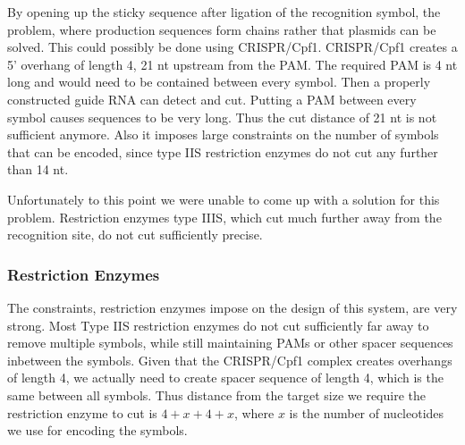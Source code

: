 \documentclass[
11pt, %
a4paper, %
oneside, %
headinclude,footinclude, %
BCOR5mm, %
]{scrartcl}
\begin{document}
By opening up the sticky sequence after ligation of the recognition symbol, the
problem, where production sequences form chains rather that plasmids can be
solved. This could possibly be done using CRISPR/Cpf1. CRISPR/Cpf1 creates a 5'
overhang of length 4, 21 nt upstream from the PAM. The required PAM is 4 nt
long and would need to be contained between every symbol. Then a properly
constructed guide RNA can detect and cut. Putting a PAM between every symbol
causes sequences to be very long. Thus the cut distance of 21 nt is not
sufficient anymore. Also it imposes large constraints on the number of symbols
that can be encoded, since type IIS restriction enzymes do not cut any further
than 14 nt.

Unfortunately to this point we were unable to come up with a solution for this
problem. Restriction enzymes type IIIS, which cut much further away from the
recognition site, do not cut sufficiently precise.




\subsubsection{Restriction Enzymes}

The constraints, restriction enzymes impose on the design of this system, are
very strong. Most Type IIS restriction enzymes do not cut sufficiently far away
to remove multiple symbols, while still maintaining PAMs or other spacer
sequences inbetween the symbols. Given that the CRISPR/Cpf1 complex creates
overhangs of length 4, we actually need to create spacer sequence of length 4,
which is the same between all symbols. Thus distance from the target size we
require the restriction enzyme to cut is $4 + x + 4 + x$, where $x$ is the
number of nucleotides we use for encoding the symbols.
\end{document}
